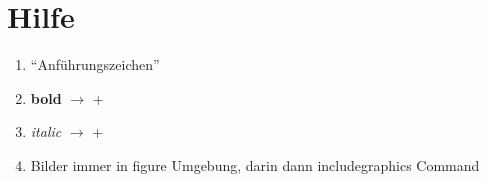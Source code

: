 


\renewcommand{\thesisTitle}{TBD}
\renewcommand{\thesisAuthor}{Patric Bader}
\renewcommand{\thesisAuthorMatrikel}{2137191}
\renewcommand{\thesisFieldOfStudy}{Media Systems}
\renewcommand{\thesisFaculty}{Design, Medien und Information}
\renewcommand{\thesisDepartment}{Medientechnik}
\renewcommand{\thesisFirstExaminer}{Prof. Dr. Andreas Plaß}		%
\renewcommand{\thesisSecondExaminer}{TBD}	%




	\createCover
	\addtocounter{page}{-1}

	\tableoftodos

	\tableofcontents

%	
%	
%	
%	
%	
%	


\chapter{Hilfe}

\begin{enumerate}
	\item "`Anführungszeichen"'
	\item \textbf{bold} $\rightarrow$  + 
	\item \textit{italic} $\rightarrow$  + 
	\item Bilder immer in figure Umgebung, darin dann includegraphics Command
\end{enumerate}

